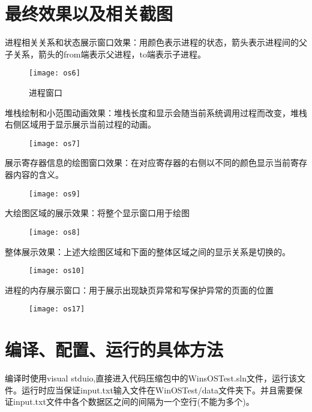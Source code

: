 \documentclass[]{report}
\begin{document}
\section{最终效果以及相关截图}
进程相关关系和状态展示窗口效果：用颜色表示进程的状态，箭头表示进程间的父子关系，箭头的from端表示父进程，to端表示子进程。
\begin{figure}[H]%
	\centering  %
	\texttt{[image: os6]}  
	\caption{进程窗口}  %
	\label{fig9}
\end{figure}
堆栈绘制和小范围动画效果：堆栈长度和显示会随当前系统调用过程而改变，堆栈右侧区域用于显示展示当前过程的动画。
\begin{figure}[H]%
	\centering  %
	\texttt{[image: os7]}  
	\caption{}  %
	\label{fig10}
\end{figure}
展示寄存器信息的绘图窗口效果：在对应寄存器的右侧以不同的颜色显示当前寄存器内容的含义。
\begin{figure}[H]%
	\centering  %
	\texttt{[image: os9]}  
	\caption{}  %
	\label{fig12}
\end{figure}
大绘图区域的展示效果：将整个显示窗口用于绘图
\begin{figure}[H]%
	\centering  %
	\texttt{[image: os8]}  
	\caption{}  %
	\label{fig11}
\end{figure}
整体展示效果：上述大绘图区域和下面的整体区域之间的显示关系是切换的。
\begin{figure}[H]%
	\centering  %
	\texttt{[image: os10]}  
	\caption{}  %
	\label{fig13}
\end{figure}
进程的内存展示窗口：用于展示出现缺页异常和写保护异常的页面的位置
\begin{figure}[H]%
	\centering  %
	\texttt{[image: os17]}  
	\caption{}  %
	\label{fig18}
\end{figure}
\section{编译、配置、运行的具体方法}
编译时使用visual stduio,直接进入代码压缩包中的WinsOSTest.sln文件，运行该文件。运行时应当保证input.txt输入文件在WinOSTest/data文件夹下。并且需要保证input.txt文件中各个数据区之间的间隔为一个空行(不能为多个)。
\end{document}
